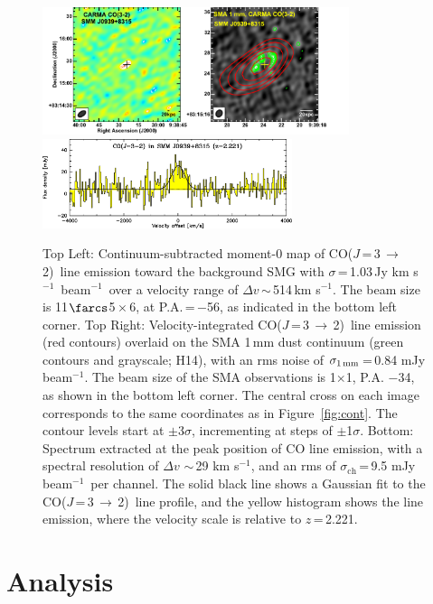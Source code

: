 \documentclass[twocolumn,apj,numberedappendix]{emulateapj}
\newcommand{\CO}{\mbox{CO($J$\,=\,3\,$\rightarrow$\,2) }}
\newcommand{\pmOne}{\mbox{$^{-1}$}}
\begin{document}
\begin{figure}[tbph]
\centering
\includegraphics[width=0.8\textwidth]{Figure/LinePanel.pdf}
\includegraphics[width=0.65\textwidth]{Figure/smmj0939-co32_spec.eps}
\caption{Top Left: Continuum-subtracted moment-0 map of \CO line emission toward
the background SMG with $\sigma$\,=\,1.03\,Jy\,\,km\,\,s\pmOne\ beam\pmOne\ over a velocity range of $\Delta v$\,$\sim$\,514\,km\,\,s\pmOne. The beam size is 11$\farcs$5\,$\times$\,6, at P.A.\,=\,$-$56\degr, as indicated in the bottom left corner.
Top Right: Velocity-integrated \CO line emission (red contours) overlaid on the SMA 1\,mm dust continuum (green contours and grayscale; H14), with an rms noise of $\sigma_\textrm{1\,mm}$\,=\,0.84 mJy beam\pmOne. The beam size of the SMA observations is 1$ \times $1, P.A. $-$34\degr, as shown
in the bottom left corner.
The central cross on each image corresponds to the same coordinates as in Figure~\ref{fig:cont}. The contour levels start at $\pm$3$\sigma$, incrementing at
steps of $\pm$1$\sigma$.
Bottom:
Spectrum extracted at the peak position of CO line emission, with a spectral resolution of $\Delta v$ $\sim$\,29 km\,\,s\pmOne, and an rms of $\sigma_\textrm{ch}$\,=\,9.5 mJy beam\pmOne\ per channel. The
solid black line shows a Gaussian fit to the \CO line profile, and the yellow histogram shows the
line emission, where the velocity scale is relative to $z$\,=\,2.221.
\label{fig:mom0}}
\end{figure}


\section{Analysis}
\end{document}
